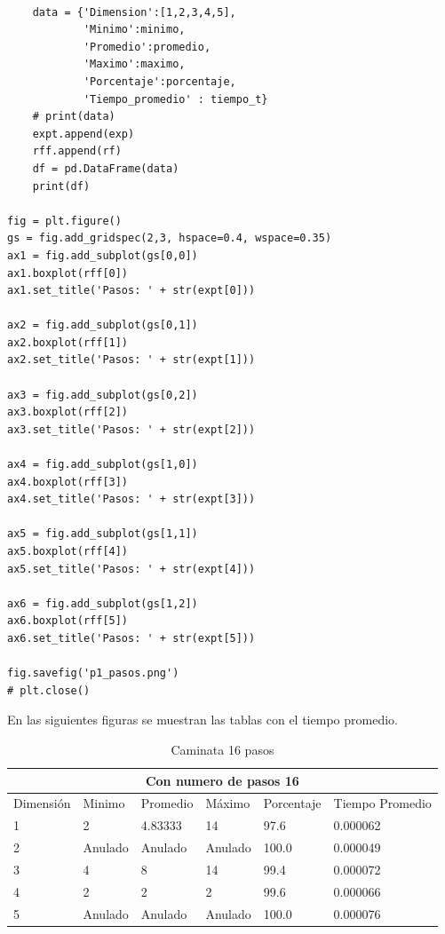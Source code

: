 \documentclass{article}
\begin{document}
\begin{verbatim}
            
    data = {'Dimension':[1,2,3,4,5], 
            'Minimo':minimo, 
            'Promedio':promedio, 
            'Maximo':maximo,
            'Porcentaje':porcentaje,
            'Tiempo_promedio' : tiempo_t} 
    # print(data)
    expt.append(exp)
    rff.append(rf)
    df = pd.DataFrame(data)
    print(df)
        
fig = plt.figure()
gs = fig.add_gridspec(2,3, hspace=0.4, wspace=0.35)
ax1 = fig.add_subplot(gs[0,0])
ax1.boxplot(rff[0])
ax1.set_title('Pasos: ' + str(expt[0]))

ax2 = fig.add_subplot(gs[0,1])
ax2.boxplot(rff[1])
ax2.set_title('Pasos: ' + str(expt[1]))
                      
ax3 = fig.add_subplot(gs[0,2])
ax3.boxplot(rff[2])
ax3.set_title('Pasos: ' + str(expt[2]))

ax4 = fig.add_subplot(gs[1,0])
ax4.boxplot(rff[3])
ax4.set_title('Pasos: ' + str(expt[3]))

ax5 = fig.add_subplot(gs[1,1])
ax5.boxplot(rff[4])
ax5.set_title('Pasos: ' + str(expt[4]))

ax6 = fig.add_subplot(gs[1,2])
ax6.boxplot(rff[5])
ax6.set_title('Pasos: ' + str(expt[5]))

fig.savefig('p1_pasos.png')
# plt.close()

\end{verbatim}

En las siguientes figuras se muestran las tablas con el tiempo promedio.\\

\begin{table}[H]
\centering
\begin{tabular}{ |p{2cm}||p{2cm}|p{2cm}|p{2cm}|p{2cm  }|p{2cm}|}
 \hline
 \multicolumn{6}{|c|}{Con numero de pasos 16} \\
 \hline
 Dimensión&Minimo&Promedio&Máximo&Porcentaje&Tiempo Promedio\\
 \hline
 1   & 2       & 4.83333  & 14      & 97.6  & 0.000062\\
 2   & Anulado & Anulado  & Anulado & 100.0 & 0.000049\\
 3   & 4       & 8        & 14      & 99.4  & 0.000072\\
 4   & 2       & 2        & 2       & 99.6  & 0.000066\\
 5   & Anulado & Anulado  & Anulado & 100.0 & 0.000076\\
 \hline
\end{tabular}
\caption{Caminata 16 pasos}
\label{table:7}
\end{table}
\end{document}
